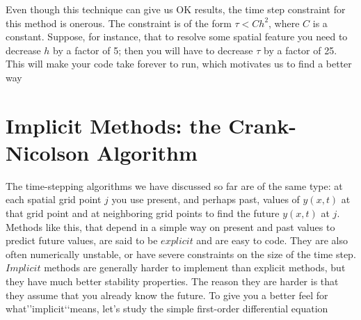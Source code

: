 Even though this technique can give us OK results, the time step constraint for this
method is onerous. The constraint is of the form $\tau < C h^2$, where $C$ is a constant.
Suppose, for instance, that to resolve some spatial feature you need to decrease $h$
by a factor of 5; then you will have to decrease $\tau$ by a factor of 25. This will make
your code take forever to run, which motivates us to find a better way

\section*{Implicit Methods: the Crank-Nicolson Algorithm}

The time-stepping algorithms we have discussed so far are of the same type: at
each spatial grid point $j$ you use present, and perhaps past, values of $y(x,t)$ at that
grid point and at neighboring grid points to find the future $y(x,t)$ at $j$. Methods
like this, that depend in a simple way on present and past values to predict future
values, are said to be $explicit$ and are easy to code. They are also often numerically
unstable, or have severe constraints on the size of the time step.\\
$Implicit$ methods are generally harder to implement than explicit methods,
but they have much better stability properties. The reason they are harder is that
they assume that you already know the future. To give you a better feel for what\rq\rq implicit\lq\lq means, let\rq s study the simple first-order differential equation

